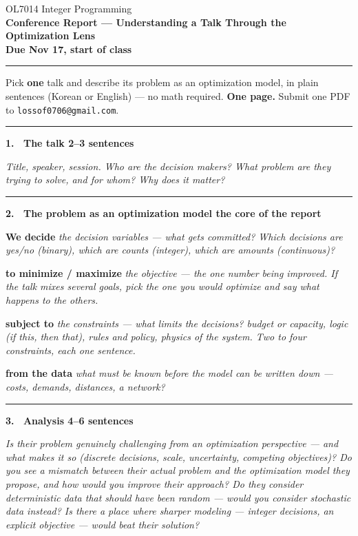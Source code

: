 \documentclass[10pt]{article}
\newcommand{\repsec}[1]{%
  \par\smallskip
  {\color{ruleink}\rule{\textwidth}{1pt}}\par\nobreak\vspace{3pt}
  {\bfseries #1}\par\nobreak\vspace{3pt}}
\newcommand{\hint}[1]{{\color{hintink}\small\itshape #1}\par\vspace{2pt}}
\newcommand{\blank}[1]{\vspace{#1}}
\begin{document}
\begin{center}
  {\large OL7014 Integer Programming}\\[3pt]
  {\Large\bfseries Conference Report --- Understanding a Talk Through the Optimization Lens}\\[4pt]
  {\small \textbf{Due Nov 17, start of class}}
\end{center}
\medskip\hrule\medskip

Pick \textbf{one} talk and describe its problem as an optimization model, in plain sentences
(Korean or English) --- no math required. \textbf{One page.} Submit one PDF to \texttt{lossof0706@gmail.com}.

\repsec{1. \ The talk \hfill \normalfont\small 2--3 sentences}
\hint{Title, speaker, session. Who are the decision makers? What problem are they trying
to solve, and for whom? Why does it matter?}
\blank{3.6em}

\repsec{2. \ The problem as an optimization model \hfill \normalfont\small the core of the report}

\textbf{We decide} \dotfill
\hint{the decision variables --- what gets committed? Which decisions are yes/no (binary),
which are counts (integer), which are amounts (continuous)?}
\blank{2.4em}

\textbf{to minimize / maximize} \dotfill
\hint{the objective --- the one number being improved. If the talk mixes several goals,
pick the one you would optimize and say what happens to the others.}
\blank{2.4em}

\textbf{subject to} \dotfill
\hint{the constraints --- what limits the decisions? budget or capacity,
logic (if this, then that), rules and policy, physics of the system.
Two to four constraints, each one sentence.}
\blank{3.6em}

\textbf{from the data} \dotfill
\hint{what must be known before the model can be written down --- costs, demands, distances,
a network?}
\blank{2.4em}

\repsec{3. \ Analysis \hfill \normalfont\small 4--6 sentences}
\hint{Is their problem genuinely challenging from an optimization perspective --- and what
makes it so (discrete decisions, scale, uncertainty, competing objectives)? Do you see a
mismatch between their actual problem and the optimization model they propose, and how
would you improve their approach? Do they consider deterministic data that should have
been random --- would you consider stochastic data instead? Is there a place where sharper
modeling --- integer decisions, an explicit objective --- would beat their solution?}
\blank{5.2em}
\end{document}
